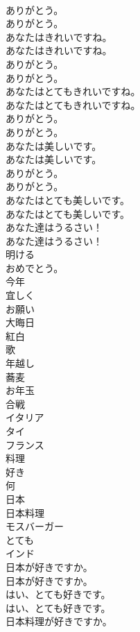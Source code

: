 \documentclass[8pt]{extreport}
\begin{document}
\begin{CJK}{UTF8}{min}
\\	ありがとう。	
\\	ありがとう。 
\\	あなたはきれいですね。	
\\	あなたはきれいですね。 
\\	ありがとう。	
\\	ありがとう。 
\\	あなたはとてもきれいですね。	
\\	あなたはとてもきれいですね。 
\\	ありがとう。	
\\	ありがとう。 
\\	あなたは美しいです。	
\\	あなたは美しいです。 
\\	ありがとう。	
\\	ありがとう。 
\\	あなたはとても美しいです。	
\\	あなたはとても美しいです。 
\\	あなた達はうるさい！	
\\	あなた達はうるさい！ 
\\	明ける
\\	おめでとう。
\\	今年
\\	宜しく
\\	お願い
\\	大晦日
\\	紅白
\\	歌
\\	年越し
\\	蕎麦
\\	お年玉
\\	合戦
\\	イタリア
\\	タイ
\\	フランス
\\	料理
\\	好き
\\	何
\\	日本
\\	日本料理
\\	モスバーガー
\\	とても
\\	インド
\\	日本が好きですか。	
\\	日本が好きですか。 
\\	はい、とても好きです。	
\\	はい、とても好きです。 
\\	日本料理が好きですか。	

\end{CJK}
\end{document}
